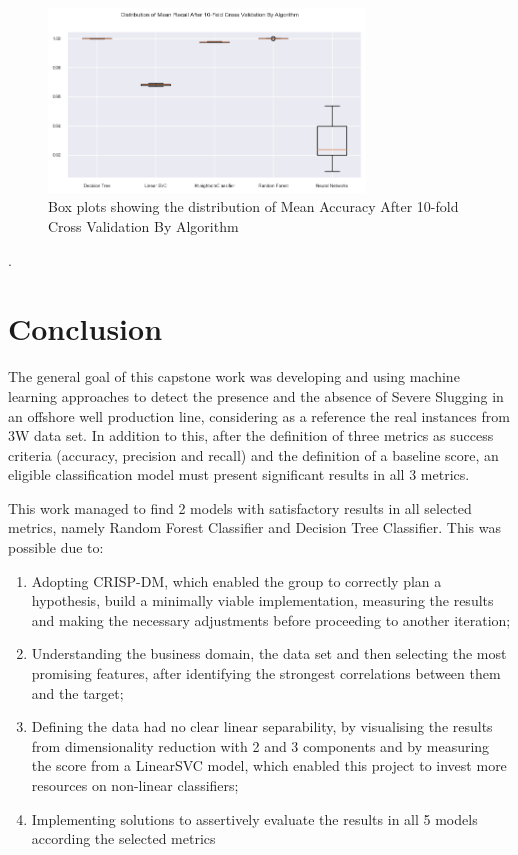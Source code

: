 \documentclass{article}
\begin{document}
\begin{figure}
\centering
\includegraphics[width=0.75\textwidth]{10_fold_rec.png}
\caption{\label{fig:10_fold_rec}Box plots showing the distribution of Mean Accuracy After 10-fold Cross Validation By Algorithm}
\end{figure}.


\section{Conclusion}

The general goal of this capstone work was developing and using machine learning approaches to detect the presence and the absence of Severe Slugging in an offshore well production line, considering as a reference the real instances from 3W data set. In addition to this, after the definition of three metrics as success criteria (accuracy, precision and recall) and the definition of a baseline score, an eligible classification model must present significant results in all 3 metrics. 

This work managed to find 2 models with satisfactory results in all selected metrics, namely Random Forest Classifier and Decision Tree Classifier. This was possible due to:
\begin{enumerate}
    \item Adopting CRISP-DM, which enabled the group to correctly plan a hypothesis, build a minimally viable implementation, measuring the results and making the necessary adjustments before proceeding to another iteration; 
    \item Understanding the business domain, the data set and then selecting the most promising features, after identifying the strongest correlations between them and the target;    
    \item Defining the data had no clear linear separability, by visualising the results from dimensionality reduction with 2 and 3 components and by measuring the score from a LinearSVC model, which enabled this project to invest more resources on non-linear classifiers;
    \item Implementing solutions to assertively evaluate the results in all 5 models according the selected metrics
\end{enumerate}
\end{document}
